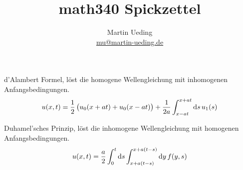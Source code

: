


\title{math340 Spickzettel}
\author{
	Martin Ueding \\
	\small{\href{mailto:mu@martin-ueding.de}{mu@martin-ueding.de}}
}



\maketitle

d'Alambert Formel, löst die homogene Wellengleichung mit inhomogenen Anfangsbedingungen.
\[
	u(x, t) = \half \del{
		u_0(x + at)
		+ u_0(x - at)
	}
	+ \frac{1}{2a} \int_{x-at}^{x+at} \dif s \, u_1(s)
\]

Duhamel'sches Prinzip, löst die inhomogene Wellengleichung mit homogenen Anfangsbedingungen.
\[
	u(x, t) = \frac a2
	\int_0^t \dif s
	\int_{x+a(t-s)}^{x+a(t-s)} \dif y \, f(y, s)
\]

%	
%	



